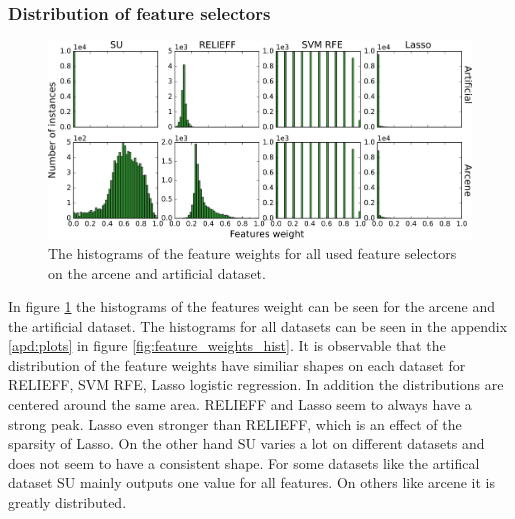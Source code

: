 \documentclass[twoside,11pt]{article}
\begin{document}
\subsubsection{Distribution of feature selectors}
\begin{figure}[h!]
  \centering
    \includegraphics[width=\textwidth]{feature_weights_hist_arcene_artificial.png}
  \caption{The histograms of the feature weights for all used feature selectors on the arcene and artificial dataset.}
  \label{fig:feature_weights_hist_arcene_artificial}
\end{figure}
In figure \ref{fig:feature_weights_hist_arcene_artificial} the histograms of the features weight can be seen for the arcene and the artificial dataset. The histograms for all datasets can be seen in the appendix \ref{apd:plots} in figure \ref{fig:feature_weights_hist}.
It is observable that the distribution of the feature weights have similiar shapes on each dataset for RELIEFF, SVM RFE, Lasso logistic regression. In addition the distributions are centered around the same area. RELIEFF and Lasso seem to always have a strong peak. Lasso even stronger than RELIEFF, which is an effect of the sparsity of Lasso. On the other hand SU varies a lot on different datasets and does not seem to have a consistent shape. For some datasets like the artifical dataset SU mainly outputs one value for all features. On others like arcene it is greatly distributed. 
\end{document}
